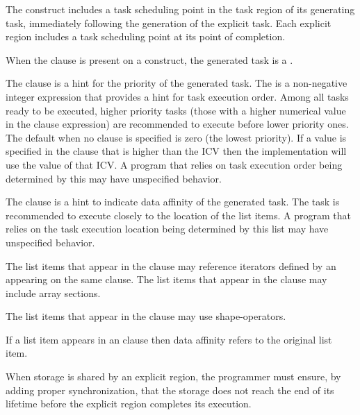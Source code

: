 The  construct includes a task scheduling point in the task region of its generating
task, immediately following the generation of the explicit task. Each explicit 
region includes a task scheduling point at its point of completion.

When the  clause is present on a  construct, the generated task is a .

The  clause is a hint for the priority of the generated task. The  is a
non-negative integer expression that provides a hint for task execution order. Among all
tasks ready to be executed, higher priority tasks (those with a higher numerical value in the
 clause expression) are recommended to execute before lower priority ones. The default
 when no  clause is specified is zero (the lowest priority). If a value is
specified in the  clause that is higher than the  ICV then the
implementation will use the value of that ICV. A program that relies on task execution order
being determined by this  may have unspecified behavior.

The  clause is a hint to indicate data affinity of the generated
task. The task is recommended to execute closely to the location of the list items. 
A program that relies on the task execution location
being determined by this list may have unspecified behavior.

The list items that appear in the  clause may reference iterators
defined by an  appearing on the same clause.
The list items that appear in the  clause may include array sections.
\begin{ccppspecific}
The list items that appear in the  clause may use shape-operators.
\end{ccppspecific}

If a list item appears in an  clause then data affinity refers to the original list item.

\begin{note}
When storage is shared by an explicit  region, the
programmer must ensure, by adding proper synchronization, that the storage does not
reach the end of its lifetime before the explicit  region completes its execution.
\end{note}


